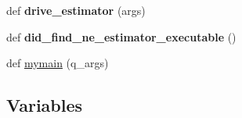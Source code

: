 \begin{DoxyCompactItemize}
\item 
def {\bfseries drive\+\_\+estimator} (args)\hypertarget{namespacenegui_1_1pgdriveneestimator_a688d7a2f0a11f0225a5f95d7403d771e}{}\label{namespacenegui_1_1pgdriveneestimator_a688d7a2f0a11f0225a5f95d7403d771e}

\item 
def {\bfseries did\+\_\+find\+\_\+ne\+\_\+estimator\+\_\+executable} ()\hypertarget{namespacenegui_1_1pgdriveneestimator_acd20398ef9d21132f19d1c0e564b25b9}{}\label{namespacenegui_1_1pgdriveneestimator_acd20398ef9d21132f19d1c0e564b25b9}

\item 
def \hyperlink{namespacenegui_1_1pgdriveneestimator_a9195d73a2642b87625772820ffff8023}{mymain} (q\+\_\+args)
\end{DoxyCompactItemize}
\subsection*{Variables}
